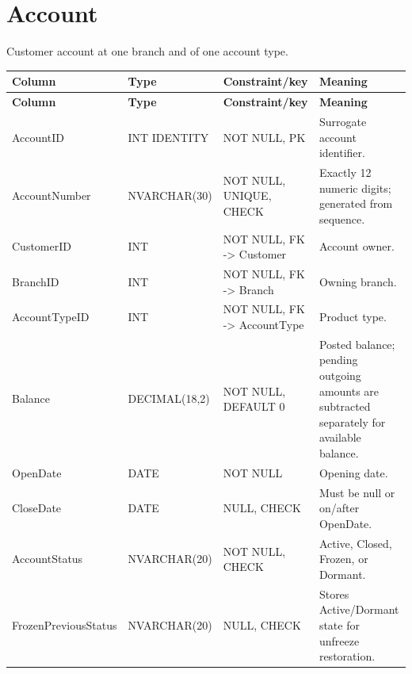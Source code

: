 \documentclass[11pt,a4paper,oneside]{report}
\begin{document}
\section{Account}
Customer account at one branch and of one account type.
\begin{longtable}{L{0.21\textwidth}L{0.18\textwidth}L{0.24\textwidth}L{0.31\textwidth}}
\toprule
\textbf{Column} & \textbf{Type} & \textbf{Constraint/key} & \textbf{Meaning}\\
\midrule\endfirsthead
\toprule\textbf{Column} & \textbf{Type} & \textbf{Constraint/key} & \textbf{Meaning}\\\midrule\endhead
AccountID & INT IDENTITY & NOT NULL, PK & Surrogate account identifier.\\
AccountNumber & NVARCHAR(30) & NOT NULL, UNIQUE, CHECK & Exactly 12 numeric digits; generated from sequence.\\
CustomerID & INT & NOT NULL, FK -> Customer & Account owner.\\
BranchID & INT & NOT NULL, FK -> Branch & Owning branch.\\
AccountTypeID & INT & NOT NULL, FK -> AccountType & Product type.\\
Balance & DECIMAL(18,2) & NOT NULL, DEFAULT 0 & Posted balance; pending outgoing amounts are subtracted separately for available balance.\\
OpenDate & DATE & NOT NULL & Opening date.\\
CloseDate & DATE & NULL, CHECK & Must be null or on/after OpenDate.\\
AccountStatus & NVARCHAR(20) & NOT NULL, CHECK & Active, Closed, Frozen, or Dormant.\\
FrozenPreviousStatus & NVARCHAR(20) & NULL, CHECK & Stores Active/Dormant state for unfreeze restoration.\\
\bottomrule
\end{longtable}
\end{document}
